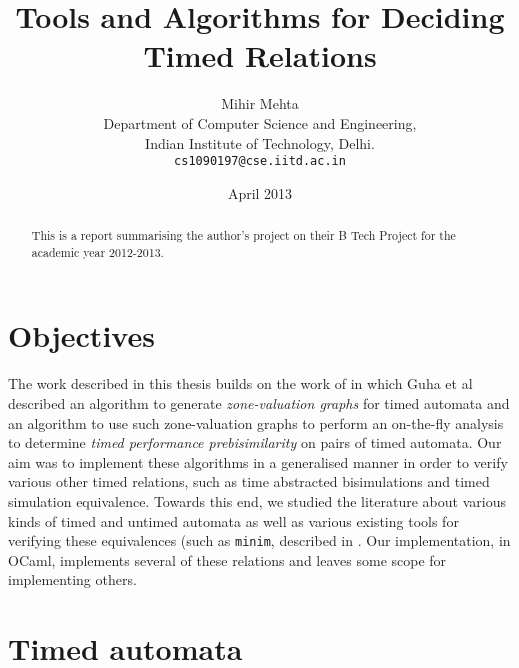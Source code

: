\documentclass{article}
\begin{document}
\title{Tools and Algorithms for Deciding Timed Relations}

\author{Mihir Mehta\\
  Department of Computer Science and Engineering,\\
  Indian Institute of Technology, Delhi.\\
  \texttt{cs1090197@cse.iitd.ac.in}
}

\date{April 2013}

\maketitle

\begin{abstract}
  This is a report summarising the author's project on their B Tech
  Project for the academic year 2012-2013.
\end{abstract}

\section{Objectives}

The work described in this thesis builds on the work of
\cite{DBLP:conf/cav/GuhaNA12} in which Guha et al described an
algorithm to generate \emph{zone-valuation graphs} for timed automata
and an algorithm to use such zone-valuation graphs to perform an
on-the-fly analysis to determine \emph{timed performance
  prebisimilarity} on pairs of timed automata. Our aim was to
implement these algorithms in a generalised manner in order to verify
various other timed relations, such as time abstracted bisimulations
\cite{tripakis2001analysis} and timed simulation equivalence. Towards
this end, we studied the literature about various kinds of timed and
untimed automata as well as various existing tools for verifying these
equivalences (such as \texttt{minim}, described in
\cite{tripakis2001analysis}. Our implementation, in OCaml, implements
several of these relations and leaves some scope for implementing others.

\section{Timed automata}

\end{document}
